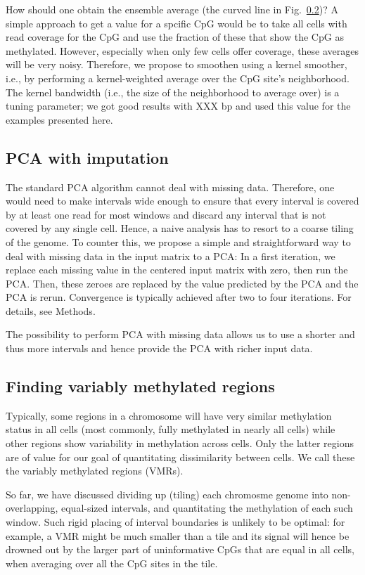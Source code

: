 \documentclass[twocolumn,10pt]{article}
\begin{document}
How should one obtain the ensemble average (the curved line in Fig.\ \ref{})? A simple approach to get a value for a spcific CpG would be to take all cells with read coverage for the CpG and use the fraction of these that show the CpG as methylated. However, especially when only few cells offer coverage, these averages will be very noisy. Therefore, we propose to smoothen using a kernel smoother, i.e., by performing a kernel-weighted average over the CpG site's neighborhood. The kernel bandwidth (i.e., the size of the neighborhood to average over) is a tuning parameter; we got good results with XXX bp and used this value for the examples presented here.

\subsection{PCA with imputation}

The standard PCA algorithm cannot deal with missing data. Therefore, one would need to make intervals wide enough to ensure that every interval is covered by at least one read for most windows and discard any interval that is not covered by any single cell. Hence, a naive analysis has to resort to a coarse tiling of the genome. To counter this, we propose a simple and straightforward way to deal with missing data in the input matrix to a PCA: In a first iteration, we replace each missing value in the centered input matrix with zero, then run the PCA. Then, these zeroes are replaced by the value predicted by the PCA and the PCA is rerun. Convergence is typically achieved after two to four iterations. For details, see Methods. 

The possibility to perform PCA with missing data allows us to use a shorter and thus more intervals and hence provide the PCA with richer input data.

\subsection{Finding variably methylated regions}

Typically, some regions in a chromosome will have very similar methylation status in all cells (most commonly, fully methylated in nearly all cells) while other regions show variability in methylation across cells. Only the latter regions are of value for our goal of quantitating dissimilarity between cells. We call these the variably methylated regions (VMRs).

So far, we have discussed dividing up (tiling) each chromosme genome into non-overlapping, equal-sized intervals, and quantitating the methylation of each such window. Such rigid placing of interval boundaries is unlikely to be optimal: for example, a VMR might be much smaller than a tile and its signal will hence be drowned out by the larger part of uninformative CpGs that are equal in all cells, when averaging over all the CpG sites in the tile.
\end{document}
